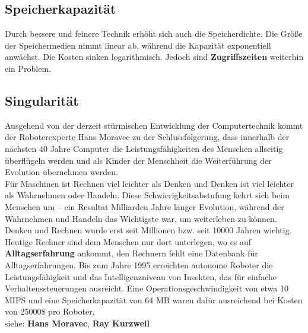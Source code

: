 \documentclass[a4paper]{article}
\begin{document}
\subsection{Speicherkapazität}
Durch bessere und feinere Technik erhöht sich auch die Speicherdichte. Die Größe der Speichermedien nimmt linear ab, während die Kapazität exponentiell anwächst. Die Kosten sinken logarithmisch. Jedoch sind \textbf{Zugriffszeiten} weiterhin ein Problem.

\subsection{Singularität}
Ausgehend von der derzeit stürmischen Entwicklung der Computertechnik kommt der Roboterexperte Hans Moravec zu der Schlussfolgerung, dass innerhalb der nächsten 40 Jahre Computer die Leistungsfähigkeiten des Menschen allseitig überflügeln werden und als Kinder der Menschheit die Weiterführung der Evolution übernehmen werden.\\

Für Maschinen ist Rechnen viel leichter als Denken und Denken ist viel leichter als Wahrnehmen oder Handeln. Diese Schwierigkeitsabstufung kehrt sich beim Menschen um -- ein Resultat Milliarden Jahre langer Evolution, während der Wahrnehmen und Handeln das Wichtigste war, um weiterleben zu können. Denken und Rechnen wurde erst seit Millionen bzw. seit 10000 Jahren wichtig. Heutige Rechner sind dem Menschen nur dort unterlegen, wo es auf \textbf{Alltagserfahrung} ankommt, den Rechnern fehlt eine Datenbank für Alltagserfahrungen. Bis zum Jahre 1995 erreichten autonome Roboter die Leistungsfähigkeit und das Intelligenzniveau von Insekten, das für einfache Verhaltenssteuerungen ausreicht. Eine Operationsgeschwindigkeit von etwa 10 MIPS und eine Speicherkapazität von 64 MB waren dafür ausreichend bei Kosten von 25000\$ pro Roboter.\\

siehe: \textbf{Hans Moravec}, \textbf{Ray Kurzweil}
\end{document}
